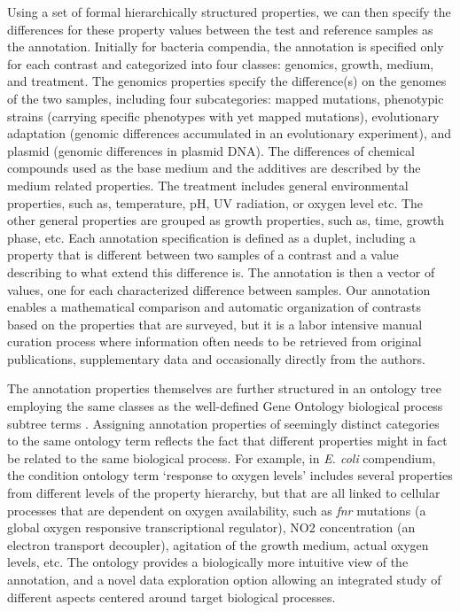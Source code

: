 Using a set of formal hierarchically structured properties, we can then
specify the differences for these property values between the test and
reference samples as the annotation.
%
Initially for bacteria compendia, the annotation is specified only for each
contrast and categorized into four classes: genomics, growth, medium, and
treatment.
%
The genomics properties specify the difference(s) on the genomes of the two
samples, including four subcategories: mapped mutations, phenotypic strains
(carrying specific phenotypes with yet mapped mutations), evolutionary
adaptation (genomic differences accumulated in an evolutionary experiment), and
plasmid (genomic differences in plasmid DNA).
%
The differences of chemical compounds used as the base medium and the additives
are described by the medium related properties.
%
The treatment includes general environmental properties, such as, temperature,
pH, UV radiation, or oxygen level etc.
%
The other general properties are grouped as growth properties, such as, time,
growth phase, etc.
%
Each annotation specification is defined as a duplet, including a property that
is different between two samples of a contrast and a value describing to what
extend this difference is.
%
The annotation is then a vector of values, one for each characterized
difference between samples.
%
Our annotation enables a mathematical comparison and automatic organization of
contrasts based on the properties that are surveyed, but it is a labor
intensive manual curation process where information often needs to be retrieved
from original publications, supplementary data and occasionally directly from
the authors.


%
The annotation properties themselves are further structured in an ontology
tree employing the same classes as the well-defined Gene Ontology biological
process subtree terms \cite{Gene2010}.
%
Assigning annotation properties of seemingly distinct categories to the same
ontology term reflects the fact that different properties might in fact be
related to the same biological process. 
%
For example, in \textit{E. coli} compendium, the condition ontology term
‘response to oxygen levels’ includes several properties from different levels
of the property hierarchy, but that are all linked to cellular processes that
are dependent on oxygen availability, such as \textit{fnr} mutations (a global
oxygen responsive transcriptional regulator), NO2 concentration (an electron
transport decoupler), agitation of the growth medium, actual oxygen levels,
etc.
%
The ontology provides a biologically more intuitive view of the annotation, and
a novel data exploration option allowing an integrated study of different
aspects centered around target biological processes.


